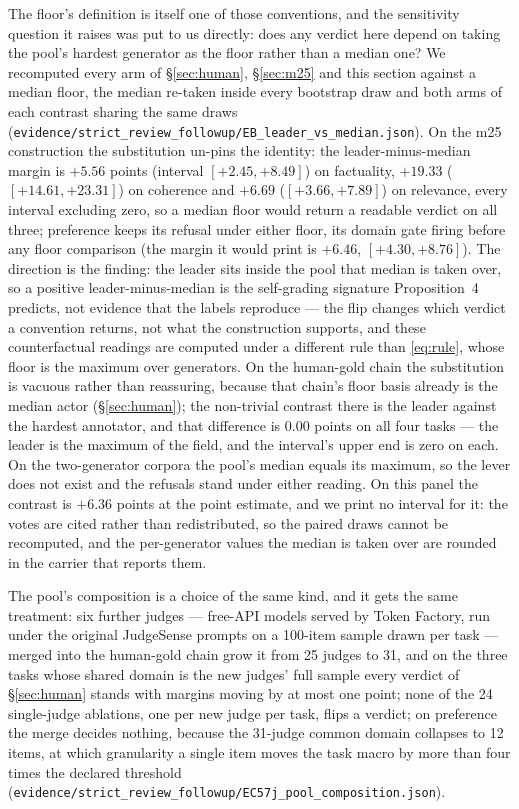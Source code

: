 \documentclass{article}
\newcommand{\ids}[1]{\texttt{\small #1}} %
\begin{document}
The floor's definition is itself one of those conventions, and the sensitivity question it raises was put to us directly: does any verdict here depend on taking the pool's hardest generator as the floor rather than a median one? We recomputed every arm of \S\ref{sec:human}, \S\ref{sec:m25} and this section against a median floor, the median re-taken inside every bootstrap draw and both arms of each contrast sharing the same draws (\ids{evidence/strict\_review\_followup/EB\_leader\_vs\_median.json}). On the m25 construction the substitution un-pins the identity: the leader-minus-median margin is $+5.56$ points (interval $[+2.45,+8.49]$) on factuality, $+19.33$ ($[+14.61,+23.31]$) on coherence and $+6.69$ ($[+3.66,+7.89]$) on relevance, every interval excluding zero, so a median floor would return a readable verdict on all three; preference keeps its refusal under either floor, its domain gate firing before any floor comparison (the margin it would print is $+6.46$, $[+4.30,+8.76]$). The direction is the finding: the leader sits inside the pool that median is taken over, so a positive leader-minus-median is the self-grading signature Proposition~4 predicts, not evidence that the labels reproduce --- the flip changes which verdict a convention returns, not what the construction supports, and these counterfactual readings are computed under a different rule than \eqref{eq:rule}, whose floor is the maximum over generators. On the human-gold chain the substitution is vacuous rather than reassuring, because that chain's floor basis already is the median actor (\S\ref{sec:human}); the non-trivial contrast there is the leader against the hardest annotator, and that difference is $0.00$ points on all four tasks --- the leader is the maximum of the field, and the interval's upper end is zero on each. On the two-generator corpora the pool's median equals its maximum, so the lever does not exist and the refusals stand under either reading. On this panel the contrast is $+6.36$ points at the point estimate, and we print no interval for it: the votes are cited rather than redistributed, so the paired draws cannot be recomputed, and the per-generator values the median is taken over are rounded in the carrier that reports them.

The pool's composition is a choice of the same kind, and it gets the same treatment: six further judges --- free-API models served by Token Factory, run under the original JudgeSense prompts on a 100-item sample drawn per task --- merged into the human-gold chain grow it from 25 judges to 31, and on the three tasks whose shared domain is the new judges' full sample every verdict of \S\ref{sec:human} stands with margins moving by at most one point; none of the 24 single-judge ablations, one per new judge per task, flips a verdict; on preference the merge decides nothing, because the 31-judge common domain collapses to 12 items, at which granularity a single item moves the task macro by more than four times the declared threshold (\ids{evidence/strict\_review\_followup/\allowbreak EC57j\_pool\_composition.json}).
\end{document}

